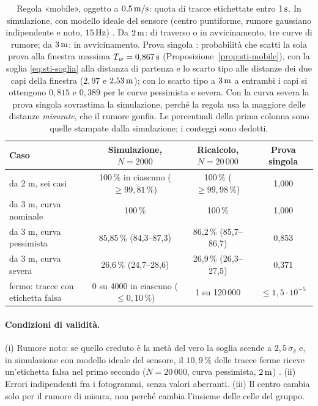 \begin{table}[H]\centering\footnotesize
\caption{Regola «mobile», oggetto a $0{,}5\,\mathrm{m/s}$: quota di tracce etichettate entro $1\,\mathrm{s}$. In simulazione, con modello ideale del sensore (centro puntiforme, rumore gaussiano indipendente e noto, $15\,\mathrm{Hz}$) . Da $2\,\mathrm{m}$: di traverso o in avvicinamento, tre curve di rumore; da $3\,\mathrm{m}$: in avvicinamento. Prova singola : probabilità che scatti la sola prova alla finestra massima $T_w=0{,}867\,\mathrm{s}$ (Proposizione~\ref{prop:sti-mobile}), con la soglia \eqref{eq:sti-soglia} alla distanza di partenza e lo scarto tipo alle distanze dei due capi della finestra ($2{,}97$ e $2{,}53\,\mathrm{m}$); con lo scarto tipo a $3\,\mathrm{m}$ a entrambi i capi si ottengono $0{,}815$ e $0{,}389$ per le curve pessimista e severa. Con la curva severa la prova singola sovrastima la simulazione, perché la regola usa la maggiore delle distanze \emph{misurate}, che il rumore gonfia. Le percentuali della prima colonna sono quelle stampate dalla simulazione; i conteggi sono dedotti.}\label{tab:sti-mobile}
\begin{tabular}{lccc}
\toprule
Caso & Simulazione, $N=2000$ & Ricalcolo, $N=20\,000$ & Prova singola\\
\midrule
da 2 m, sei casi & 100\,\% in ciascuno ($\ge99{,}81\,\%$) & 100\,\% ($\ge99{,}98\,\%$) & 1,000\\
da 3 m, curva nominale & 100\,\% & 100\,\% & 1,000\\
da 3 m, curva pessimista & 85,85\,\% (84,3--87,3) & 86,2\,\% (85,7--86,7) & 0,853\\
da 3 m, curva severa & 26,6\,\% (24,7--28,6) & 26,9\,\% (26,3--27,5) & 0,371\\
fermo: tracce con etichetta falsa & 0 su 4000 in ciascuno ($\le0{,}10\,\%$) & 1 su 120\,000 & $\le1{,}5\cdot10^{-5}$\\
\bottomrule
\end{tabular}
\end{table}
\paragraph{Condizioni di validità.} (i) Rumore noto: se quello creduto è la metà del vero la soglia scende a $2{,}5\,\sigma_\delta$ e, in simulazione con modello ideale del sensore, il $10{,}9\,\%$ delle tracce ferme riceve un'etichetta falsa nel primo secondo ($N=20\,000$, curva pessimista, $2\,\mathrm{m}$) . (ii) Errori indipendenti fra i fotogrammi, senza valori aberranti. (iii) Il centro cambia solo per il rumore di misura, non perché cambia l'insieme delle celle del gruppo.

